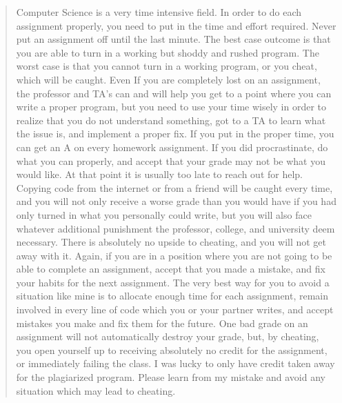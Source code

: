 \documentclass[12pt]{scrartcl}
\begin{document}
\begin{quote}
	Computer Science is a very time intensive field.  In order to do each assignment properly, you need to put in the time and effort required.  Never put an assignment off until the last minute.  The best case outcome is that you are able to turn in a working but shoddy and rushed program.  The worst case is that you cannot turn in a working program, or you cheat, which will be caught.  Even If you are completely lost on an assignment, the professor and TA's can and will help you get to a point where you can write a proper program, but you need to use your time wisely in order to realize that you do not understand something, got to a TA to learn what the issue is, and implement a proper fix.  If you put in the proper time, you can get an A on every homework assignment.  If you did procrastinate, do what you can properly, and accept that your grade may not be what you would like.  At that point it is usually too late to reach out for help.  Copying code from the internet or from a friend will be caught every time, and you will not only receive a worse grade than you would have if you had only turned in what you personally could write, but you will also face whatever additional punishment the professor, college, and university deem necessary.  There is absolutely no upside to cheating, and you will not get away with it.  Again, if you are in a position where you are not going to be able to complete an assignment, accept that you made a mistake, and fix your habits for the next assignment.  The very best way for you to avoid a situation like mine is to allocate enough time for each assignment, remain involved in every line of code which you or your partner writes, and accept mistakes you make and fix them for the future.  One bad grade on an assignment will not automatically destroy your grade, but, by cheating, you open yourself up to receiving absolutely no credit for the assignment, or immediately failing the class.  I was lucky to only have credit taken away for the plagiarized program.  Please learn from my mistake and avoid any situation which may lead to cheating.
\end{quote}
	
\end{document}
